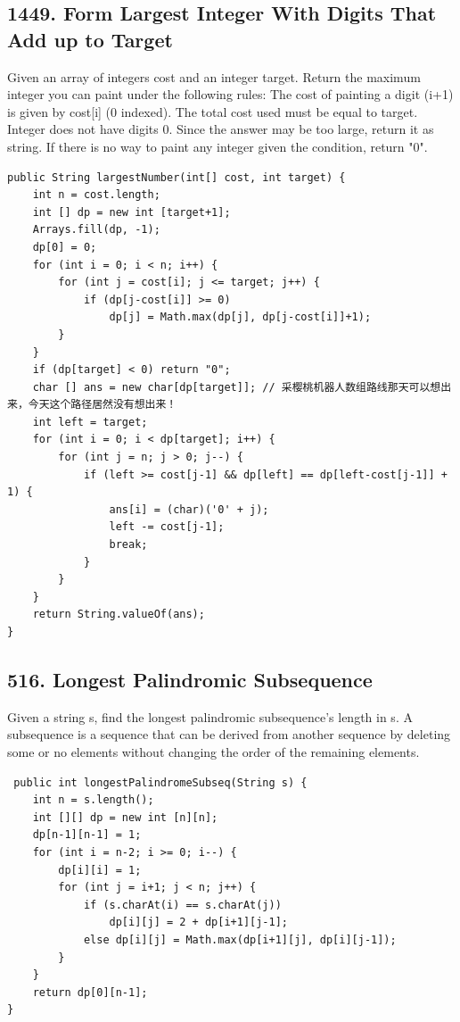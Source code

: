 \documentclass[9pt, b5paaper]{book}
\begin{document}
\subsection{1449. Form Largest Integer With Digits That Add up to Target}
\label{sec-1-4-31}
Given an array of integers cost and an integer target. Return the maximum integer you can paint under the following rules:
The cost of painting a digit (i+1) is given by cost[i] (0 indexed).
The total cost used must be equal to target.
Integer does not have digits 0.
Since the answer may be too large, return it as string.
If there is no way to paint any integer given the condition, return "0".
\begin{verbatim}
public String largestNumber(int[] cost, int target) { 
    int n = cost.length;
    int [] dp = new int [target+1];
    Arrays.fill(dp, -1);
    dp[0] = 0;
    for (int i = 0; i < n; i++) {
        for (int j = cost[i]; j <= target; j++) {
            if (dp[j-cost[i]] >= 0)
                dp[j] = Math.max(dp[j], dp[j-cost[i]]+1);
        }
    }
    if (dp[target] < 0) return "0";
    char [] ans = new char[dp[target]]; // 采樱桃机器人数组路线那天可以想出来，今天这个路径居然没有想出来！
    int left = target;
    for (int i = 0; i < dp[target]; i++) {
        for (int j = n; j > 0; j--) {
            if (left >= cost[j-1] && dp[left] == dp[left-cost[j-1]] + 1) {
                ans[i] = (char)('0' + j);
                left -= cost[j-1];
                break;
            }
        }
    }
    return String.valueOf(ans);
}
\end{verbatim}

\subsection{516. Longest Palindromic Subsequence}
\label{sec-1-4-32}
Given a string s, find the longest palindromic subsequence's length in s.
A subsequence is a sequence that can be derived from another sequence by deleting some or no elements without changing the order of the remaining elements.
\begin{verbatim}
 public int longestPalindromeSubseq(String s) {
    int n = s.length();
    int [][] dp = new int [n][n];
    dp[n-1][n-1] = 1;
    for (int i = n-2; i >= 0; i--) {
        dp[i][i] = 1;
        for (int j = i+1; j < n; j++) {
            if (s.charAt(i) == s.charAt(j))
                dp[i][j] = 2 + dp[i+1][j-1];
            else dp[i][j] = Math.max(dp[i+1][j], dp[i][j-1]);
        }
    }
    return dp[0][n-1];
}
\end{verbatim}
\end{document}
